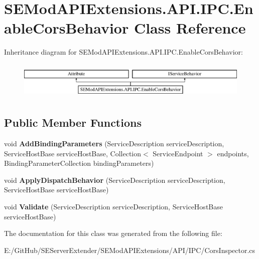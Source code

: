 \hypertarget{class_s_e_mod_a_p_i_extensions_1_1_a_p_i_1_1_i_p_c_1_1_enable_cors_behavior}{}\section{S\+E\+Mod\+A\+P\+I\+Extensions.\+A\+P\+I.\+I\+P\+C.\+Enable\+Cors\+Behavior Class Reference}
\label{class_s_e_mod_a_p_i_extensions_1_1_a_p_i_1_1_i_p_c_1_1_enable_cors_behavior}
Inheritance diagram for S\+E\+Mod\+A\+P\+I\+Extensions.\+A\+P\+I.\+I\+P\+C.\+Enable\+Cors\+Behavior\+:\begin{figure}[H]
\begin{center}
\leavevmode
\includegraphics[height=1.806452cm]{class_s_e_mod_a_p_i_extensions_1_1_a_p_i_1_1_i_p_c_1_1_enable_cors_behavior}
\end{center}
\end{figure}
\subsection*{Public Member Functions}
\begin{DoxyCompactItemize}
\item 
\hypertarget{class_s_e_mod_a_p_i_extensions_1_1_a_p_i_1_1_i_p_c_1_1_enable_cors_behavior_aa90b682d47f7af6b1efc7261e3612cc4}{}void {\bfseries Add\+Binding\+Parameters} (Service\+Description service\+Description, Service\+Host\+Base service\+Host\+Base, Collection$<$ Service\+Endpoint $>$ endpoints, Binding\+Parameter\+Collection binding\+Parameters)\label{class_s_e_mod_a_p_i_extensions_1_1_a_p_i_1_1_i_p_c_1_1_enable_cors_behavior_aa90b682d47f7af6b1efc7261e3612cc4}

\item 
\hypertarget{class_s_e_mod_a_p_i_extensions_1_1_a_p_i_1_1_i_p_c_1_1_enable_cors_behavior_acd01a734cd1ef34c0316d32274ac3e51}{}void {\bfseries Apply\+Dispatch\+Behavior} (Service\+Description service\+Description, Service\+Host\+Base service\+Host\+Base)\label{class_s_e_mod_a_p_i_extensions_1_1_a_p_i_1_1_i_p_c_1_1_enable_cors_behavior_acd01a734cd1ef34c0316d32274ac3e51}

\item 
\hypertarget{class_s_e_mod_a_p_i_extensions_1_1_a_p_i_1_1_i_p_c_1_1_enable_cors_behavior_adcd66f1b890d01c077d5b99aedbc6d02}{}void {\bfseries Validate} (Service\+Description service\+Description, Service\+Host\+Base service\+Host\+Base)\label{class_s_e_mod_a_p_i_extensions_1_1_a_p_i_1_1_i_p_c_1_1_enable_cors_behavior_adcd66f1b890d01c077d5b99aedbc6d02}

\end{DoxyCompactItemize}


The documentation for this class was generated from the following file\+:\begin{DoxyCompactItemize}
\item 
E\+:/\+Git\+Hub/\+S\+E\+Server\+Extender/\+S\+E\+Mod\+A\+P\+I\+Extensions/\+A\+P\+I/\+I\+P\+C/Cors\+Inspector.\+cs\end{DoxyCompactItemize}
